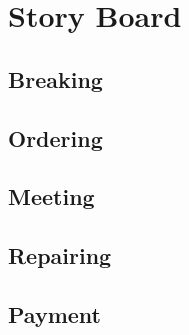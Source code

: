 \documentclass[final,a4paper]{report} %
\begin{document}
\chapter{Story Board} %
\label{ch:storyboard}

\section{Breaking}

\section{Ordering}

\section{Meeting}

\section{Repairing}

\section{Payment}
\end{document}
